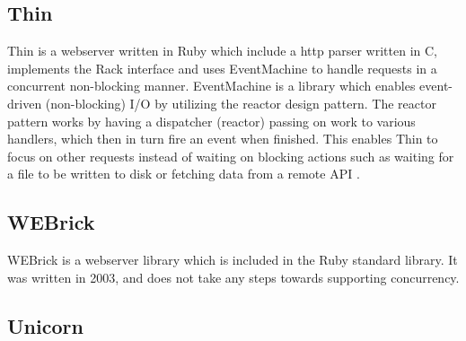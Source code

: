 \subsection{Thin}
Thin is a webserver written in Ruby which include a http parser written in C,
implements the Rack interface and uses EventMachine to handle requests in a
concurrent non-blocking manner. EventMachine is a library which enables
event-driven (non-blocking) I/O by utilizing the reactor design pattern. The
reactor pattern works by having a dispatcher (reactor) passing on work to
various handlers, which then in turn fire an event when finished. This enables
Thin to focus on other requests instead of waiting on blocking actions such as
waiting for a file to be written to disk or fetching data from a remote API
\cite{reactor}.

\subsection{WEBrick}
WEBrick is a webserver library which is included in the Ruby standard library.
It was written in 2003, and does not take any steps towards supporting
concurrency.

\subsection{Unicorn}
